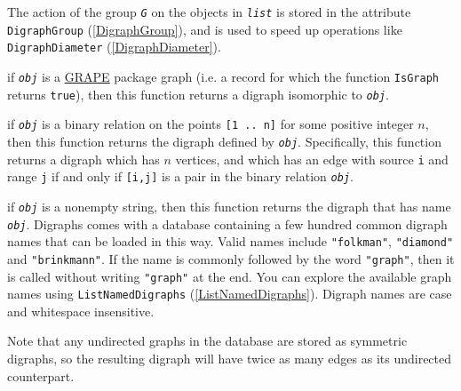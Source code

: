 \documentclass[a4paper,11pt]{report}
\begin{document}
{{{\begin{description}
 The action of the group \mbox{\texttt{\mdseries\slshape G}} on the objects in \mbox{\texttt{\mdseries\slshape list}} is stored in the attribute \texttt{DigraphGroup} (\ref{DigraphGroup}), and is used to speed up operations like \texttt{DigraphDiameter} (\ref{DigraphDiameter}). 
\item[{for a Grape package graph}]  if \mbox{\texttt{\mdseries\slshape obj}} is a \href{https://gap-packages.github.io/grape} {GRAPE}  package graph (i.e. a record for which the function \texttt{IsGraph} returns \texttt{true}), then this function returns a digraph isomorphic to \mbox{\texttt{\mdseries\slshape obj}}. 
\item[{for a binary relation}]  if \mbox{\texttt{\mdseries\slshape obj}} is a binary relation on the points \texttt{[1 .. n]} for some positive integer $n$, then this function returns the digraph defined by \mbox{\texttt{\mdseries\slshape obj}}. Specifically, this function returns a digraph which has $n$ vertices, and which has an edge with source \texttt{i} and range \texttt{j} if and only if \texttt{[i,j]} is a pair in the binary relation \mbox{\texttt{\mdseries\slshape obj}}. 
\item[{for a string naming a digraph}]  if \mbox{\texttt{\mdseries\slshape obj}} is a non\texttt{}empty string, then this function returns the
digraph that has name \mbox{\texttt{\mdseries\slshape obj}}. \textsf{Digraphs} comes with a database containing a few hundred common digraph names that can
be loaded in this way. Valid names include \texttt{"folkman"}, \texttt{"diamond"} and \texttt{"brinkmann"}. If the name is commonly followed by the word \texttt{"graph"}, then it is called without writing \texttt{"graph"} at the end. You can explore the available graph names using \texttt{ListNamedDigraphs} (\ref{ListNamedDigraphs}). Digraph names are case and whitespace insensitive. 

 Note that any undirected graphs in the database are stored as symmetric
digraphs, so the resulting digraph will have twice as many edges as its
undirected counterpart. 
\end{description}
 
}}}
\end{document}
